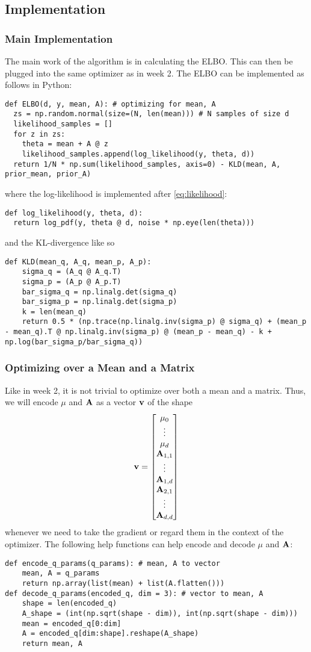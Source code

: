 \subsection{Implementation}
\subsubsection{Main Implementation}
The main work of the algorithm is in calculating the ELBO. This can then be plugged into the same optimizer as in week 2.
The ELBO can be implemented as follows in Python:
\begin{verbatim}
def ELBO(d, y, mean, A): # optimizing for mean, A
  zs = np.random.normal(size=(N, len(mean))) # N samples of size d
  likelihood_samples = []
  for z in zs:
    theta = mean + A @ z
    likelihood_samples.append(log_likelihood(y, theta, d))
  return 1/N * np.sum(likelihood_samples, axis=0) - KLD(mean, A, prior_mean, prior_A)
\end{verbatim}
where the log-likelihood is implemented after \eqref{eq:likelihood}:
\begin{verbatim}
def log_likelihood(y, theta, d):
  return log_pdf(y, theta @ d, noise * np.eye(len(theta)))
\end{verbatim}
and the KL-divergence like so
\begin{verbatim}
def KLD(mean_q, A_q, mean_p, A_p):
    sigma_q = (A_q @ A_q.T)
    sigma_p = (A_p @ A_p.T)
    bar_sigma_q = np.linalg.det(sigma_q)
    bar_sigma_p = np.linalg.det(sigma_p)
    k = len(mean_q)
    return 0.5 * (np.trace(np.linalg.inv(sigma_p) @ sigma_q) + (mean_p - mean_q).T @ np.linalg.inv(sigma_p) @ (mean_p - mean_q) - k + np.log(bar_sigma_p/bar_sigma_q))
\end{verbatim}
\subsubsection{Optimizing over a Mean and a Matrix}
Like in week 2, it is not trivial to optimize over both a mean and a matrix. Thus, we will encode $\mu$ and $\mathbf{A}$ as a vector $\mathbf{v}$ of the shape
$$\mathbf{v}=\begin{bmatrix}\mu_0 \\ \vdots \\ \mu_d \\ \mathbf{A}_{1,1} \\ \vdots \\ \mathbf{A}_{1,d} \\ \mathbf{A}_{2,1} \\ \vdots \\ \mathbf{A}_{d, d}\end{bmatrix}$$
whenever we need to take the gradient or regard them in the context of the optimizer.
The following help functions can help encode and decode $\mu$ and $\mathbf{A}$:
\begin{verbatim}
def encode_q_params(q_params): # mean, A to vector
    mean, A = q_params
    return np.array(list(mean) + list(A.flatten()))
def decode_q_params(encoded_q, dim = 3): # vector to mean, A
    shape = len(encoded_q)
    A_shape = (int(np.sqrt(shape - dim)), int(np.sqrt(shape - dim)))
    mean = encoded_q[0:dim]
    A = encoded_q[dim:shape].reshape(A_shape)
    return mean, A
\end{verbatim}
